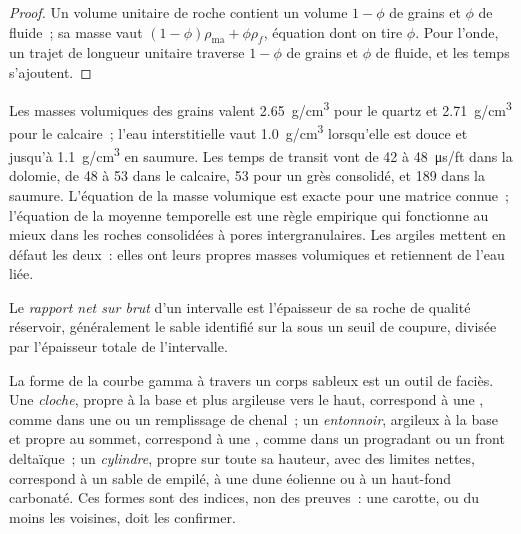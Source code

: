 \begin{proof}
Un volume unitaire de roche contient un volume $1 - \phi$ de grains et $\phi$ de
fluide~; sa masse vaut $(1 - \phi)\rho_{\mathrm{ma}} + \phi\rho_f$, équation dont on tire
$\phi$. Pour l'onde, un trajet de longueur unitaire traverse $1 - \phi$ de grains
et $\phi$ de fluide, et les temps s'ajoutent.
\end{proof}

Les masses volumiques des grains valent \qty{2.65}{g/cm^3} pour le quartz et \qty{2.71}{g/cm^3} pour
le calcaire~; l'eau interstitielle vaut \qty{1.0}{g/cm^3} lorsqu'elle est douce et
jusqu'à \qty{1.1}{g/cm^3} en saumure. Les temps de transit vont de 42 à
\qty{48}{\micro\second/ft} dans la dolomie, de 48 à 53 dans le calcaire, 53 pour un
grès consolidé, et 189 dans la saumure. L'équation de la masse volumique est exacte pour
une matrice connue~; l'équation de la moyenne temporelle est une règle empirique qui fonctionne
au mieux dans les roches consolidées à pores intergranulaires. Les argiles mettent en défaut les deux~:
elles ont leurs propres masses volumiques et retiennent de l'eau liée.

\begin{definition}\label{def:b3:facies-models:ntg}
Le \emph{rapport net sur brut} d'un intervalle est l'épaisseur de
sa roche de qualité réservoir, généralement le sable identifié sur la 
sous un seuil de coupure, divisée par l'épaisseur totale de l'intervalle.
\end{definition}

La forme de la courbe gamma à travers un corps sableux est un outil de faciès.
Une \emph{cloche}, propre à la base et plus argileuse vers le haut, correspond à une , comme dans une  ou un remplissage de chenal~; un \emph{entonnoir}, argileux à
la base et propre au sommet, correspond à une , comme dans un
 progradant ou un front deltaïque~; un \emph{cylindre}, propre sur toute sa hauteur,
avec des limites nettes, correspond à un sable de  empilé, à une dune éolienne ou à un
haut-fond carbonaté. Ces formes sont des indices, non des preuves~: une carotte, ou du moins les
 voisines, doit les confirmer.


